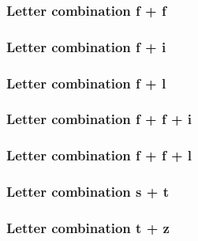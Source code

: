 \documentclass{article}
\begin{document}
\subsubsection{Letter combination f + f}
\begin{otherlanguage}{german}
\end{otherlanguage}

\subsubsection{Letter combination f + i}
\begin{otherlanguage}{german}
\end{otherlanguage}

\subsubsection{Letter combination f + l}
\begin{otherlanguage}{german}
\end{otherlanguage}

\subsubsection{Letter combination f + f + i}
\begin{otherlanguage}{german}
\end{otherlanguage}

\subsubsection{Letter combination f + f + l}
\begin{otherlanguage}{german}
\end{otherlanguage}

\subsubsection{Letter combination s + t}
\begin{otherlanguage}{german}
\setmainfont[Ligatures=Historic]{Linux Libertine O}
\end{otherlanguage}

\subsubsection{Letter combination t + z}
\begin{otherlanguage}{german}
\setmainfont[Ligatures=Rare]{Linux Libertine O}
\end{otherlanguage}
\end{document}
